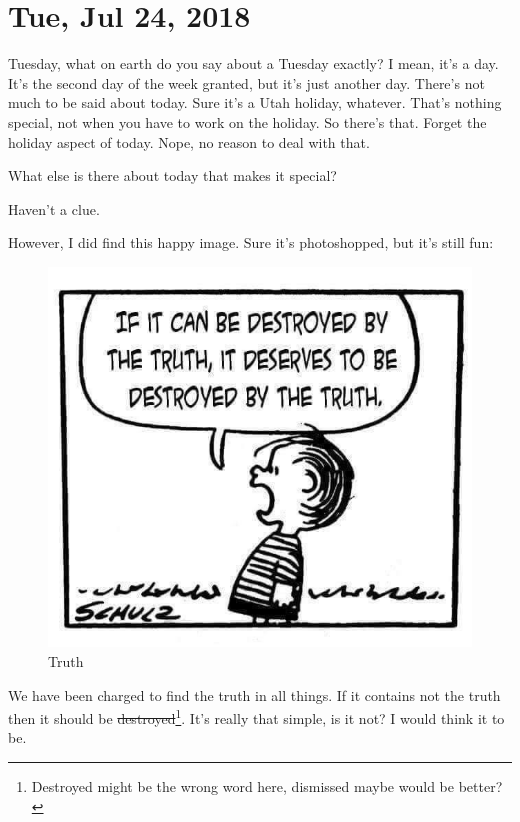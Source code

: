 \section{Tue, Jul 24, 2018}

Tuesday, what on earth do you say about a Tuesday exactly? I mean, it's a day. It's
the second day of the week granted, but it's just another day. There's not much to be
said about today. Sure it's a Utah holiday, whatever. That's nothing special, not
when you have to work on the holiday. So there's that. Forget the holiday aspect of
today. Nope, no reason to deal with that.

What else is there about today that makes it special?

Haven't a clue.

However, I did find this happy image. Sure it's photoshopped, but it's still fun:

\begin{figure}[h!]
  \centering
  \includegraphics[width=0.5\linewidth]{2018/images/truth.jpg}
  \caption{Truth}
  \label{fig:truth}
\end{figure}

We have been charged to find the truth in all things. If it contains not the truth
then it should be \st{destroyed}\footnote{Destroyed might be the wrong word here, 
dismissed maybe would be better?}. It's really that simple, is it not? I would think 
it to be.